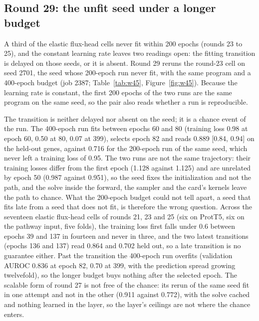 \subsection{Round 29: the unfit seed under a longer budget}
\label{sec:round29}

A third of the elastic flux-head cells never fit within 200 epochs (rounds 23 to 25),
and the constant learning rate leaves two readings open: the fitting transition is
delayed on those seeds, or it is absent. Round 29 reruns the round-23 cell on seed 2701,
the seed whose 200-epoch run never fit, with the same program and a 400-epoch budget
(job 2387; Table~\ref{tab:w45}, Figure~\ref{fig:w45}). Because the learning rate is
constant, the first 200 epochs of the two runs are the same program on the same seed,
so the pair also reads whether a run is reproducible.




The transition is neither delayed nor absent on the seed; it is a chance event of the
run. The 400-epoch run fits between epochs 60 and 80 (training loss 0.98 at epoch 60,
0.50 at 80, 0.07 at 399), selects epoch 82 and reads 0.889 [0.84, 0.94] on the held-out
genes, against 0.716 for the 200-epoch run of the same seed, which never left a training
loss of 0.95. The two runs are not the same trajectory: their training losses differ
from the first epoch (1.128 against 1.125) and are unrelated by epoch 50 (0.987 against
0.951), so the seed fixes the initialization and not the path, and the solve inside the
forward, the sampler and the card's kernels leave the path to chance. What the 200-epoch
budget could not tell apart, a seed that fits late from a seed that does not fit, is
therefore the wrong question. Across the seventeen elastic flux-head cells of rounds
21, 23 and 25 (six on ProtT5, six on the pathway input, five folds), the training loss
first falls under 0.6 between epochs 39 and 137 in fourteen and never in three, and
the two latest transitions (epochs 136 and 137) read 0.864 and 0.702 held out, so a
late transition is no guarantee either. Past the transition the 400-epoch run overfits
(validation AUROC 0.836 at epoch 82, 0.70 at 399, with the prediction spread growing
twelvefold), so the longer budget buys nothing after the selected epoch. The scalable
form of round 27 is not free of the chance: its rerun of the same seed fit in one
attempt and not in the other (0.911 against 0.772), with the solve cached and nothing
learned in the layer, so the layer's ceilings are not where the chance enters.

